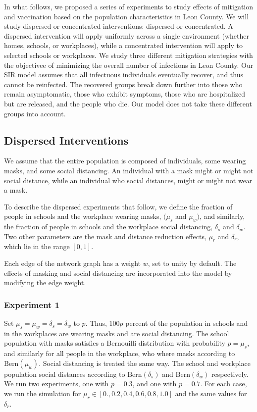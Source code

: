 \documentclass{article}
\begin{document}
In what follows, we proposed a series of experiments to study effects of mitigation and vaccination based 
on the population characteristics in Leon County. We will study dispersed or concentrated interventions: dispersed or concentrated. A dispersed intervention will apply uniformly across a single environment (whether homes, schools, or workplaces), while a concentrated intervention will apply to selected schools or workplaces. We study three different mitigation strategies with the objectivee of minimizing the overall number of infections in Leon County. 
Our SIR model assumes that all infectuous individuals eventually recover, and thus cannot be reinfected. The recovered groups break down further into those who remain asymptomatic, those who exhibit symptoms, those who are hospitalized but are released, and the people who die. Our model does not take these different groups into account. 

\subsection{Dispersed Interventions}
We assume that the entire population is composed of individuals, some wearing masks, and some social distancing. 
An individual with a mask might or might not social distance, while an individual who social distances, might or might not wear a mask. 

To describe the dispersed experiments that follow, we define the fraction of people in schools and the workplace 
wearing masks, $(\mu_s$ and $\mu_w)$, and similarly, the fraction of people in schools and the workplace social distancing, $\delta_s$ and $\delta_w$. Two other parameters are the mask and distance reduction effects, $\mu_r$ and $\delta_r$, which lie in the range $[0,1]$.

Each edge of the network graph has a weight $w$, set to unity by default. The effects of masking and social distancing are incorporated into the model by modifying the edge weight. 

\subsubsection{Experiment 1}
Set $\mu_s=\mu_w=\delta_s=\delta_w$ to $p$. Thus, $100p$ percent
of the population in schools and in the workplaces are wearing masks and are social distancing. The school population with masks satisfies a Bernouilli distribution with probability $p=\mu_s$, and similarly for all people in the workplace, who where masks according to $\textrm{Bern}(\mu_w)$. Social distancing is treated the same way. The school and workplace population social distances according to $\textrm{Bern}(\delta_s)$ and $\textrm{Bern}(\delta_w)$ respectively. We run two experiments, one with $p=0.3$, and one with $p=0.7$. For each case, we run the simulation for $\mu_r\in [0.,0.2,0.4,0.6,0.8,1.0]$ and the same values for $\delta_r$. 
\end{document}
